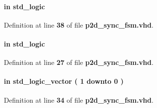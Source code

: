 \paragraph[{pct\+\_\+sync\+\_\+dis}]{ {\bfseries \textcolor{keywordflow}{in}\textcolor{vhdlchar}{ }} {\bfseries \textcolor{comment}{std\+\_\+logic}\textcolor{vhdlchar}{ }} \hspace{0.3cm}{\ttfamily [Port]}}\label{classp2d__sync__fsm_a5c679cc673022444a3781502a9232e5f}


Definition at line {\bf 38} of file {\bf p2d\+\_\+sync\+\_\+fsm.\+vhd}.

\paragraph[{reset\+\_\+n}]{ {\bfseries \textcolor{keywordflow}{in}\textcolor{vhdlchar}{ }} {\bfseries \textcolor{comment}{std\+\_\+logic}\textcolor{vhdlchar}{ }} \hspace{0.3cm}{\ttfamily [Port]}}\label{classp2d__sync__fsm_a446ea52ed8c4a84181a47d9165ce41a5}


Definition at line {\bf 27} of file {\bf p2d\+\_\+sync\+\_\+fsm.\+vhd}.

\paragraph[{sample\+\_\+width}]{ {\bfseries \textcolor{keywordflow}{in}\textcolor{vhdlchar}{ }} {\bfseries \textcolor{comment}{std\+\_\+logic\+\_\+vector}\textcolor{vhdlchar}{ }\textcolor{vhdlchar}{(}\textcolor{vhdlchar}{ }\textcolor{vhdlchar}{ } \textcolor{vhdldigit}{1} \textcolor{vhdlchar}{ }\textcolor{keywordflow}{downto}\textcolor{vhdlchar}{ }\textcolor{vhdlchar}{ } \textcolor{vhdldigit}{0} \textcolor{vhdlchar}{ }\textcolor{vhdlchar}{)}\textcolor{vhdlchar}{ }} \hspace{0.3cm}{\ttfamily [Port]}}\label{classp2d__sync__fsm_aa4357f9a7d7e21fa49f9ce61eec07e23}


Definition at line {\bf 34} of file {\bf p2d\+\_\+sync\+\_\+fsm.\+vhd}.

